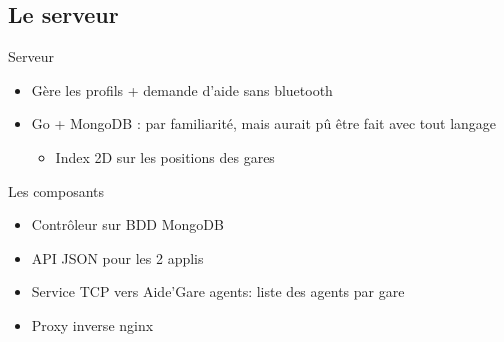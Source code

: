 \documentclass{beamer}
\begin{document}
\subsection{Le serveur}
\begin{frame}{Serveur}
    \begin{itemize}
        \item Gère les profils + demande d'aide sans bluetooth
        \item Go + MongoDB : par familiarité, mais aurait pû être fait avec tout langage
            \begin{itemize}
                \item Index 2D sur les positions des gares
            \end{itemize}
    \end{itemize}
    \begin{block}{Les composants}
        \begin{itemize}
            \item Contrôleur sur BDD MongoDB
            \item API JSON pour les 2 applis
            \item Service TCP vers Aide'Gare agents: liste des agents par gare
            \item Proxy inverse nginx
        \end{itemize}
    \end{block}
\end{frame}
\end{document}
